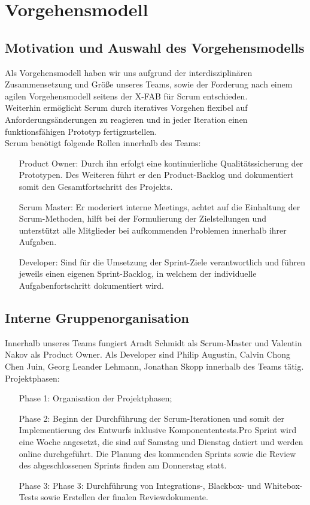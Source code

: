 \chapter{Vorgehensmodell}
\section{Motivation und Auswahl des Vorgehensmodells}

Als Vorgehensmodell haben wir uns aufgrund der interdisziplinären Zusammensetzung und Größe unseres Teams, sowie der Forderung nach einem agilen Vorgehensmodell seitens der X-FAB für Scrum entschieden.\\
Weiterhin ermöglicht Scrum durch iteratives Vorgehen flexibel auf Anforderungsänderungen zu reagieren und in jeder Iteration einen funktionsfähigen Prototyp fertigzustellen.\\

Scrum benötigt folgende Rollen innerhalb des Teams:
\begin{itemize}
	\item[Product Owner:] Durch ihn erfolgt eine kontinuierliche Qualitätssicherung der Prototypen. Des Weiteren führt er den Product-Backlog und dokumentiert somit den Gesamtfortschritt des Projekts.

	\item[Scrum Master:] Er moderiert interne Meetings, achtet auf die Einhaltung der Scrum-Methoden, hilft bei der Formulierung der Zielstellungen und unterstützt alle Mitglieder bei aufkommenden Problemen innerhalb ihrer Aufgaben.

	\item[Developer:]
	Sind für die Umsetzung der Sprint-Ziele verantwortlich und führen jeweils einen eigenen Sprint-Backlog, in welchem der individuelle Aufgabenfortschritt dokumentiert wird.

\end{itemize}

\section{Interne Gruppenorganisation}
Innerhalb unseres Teams fungiert Arndt Schmidt als Scrum-Master und Valentin Nakov als Product Owner. Als Developer sind Philip Augustin, Calvin Chong Chen Juin, Georg Leander Lehmann, Jonathan Skopp innerhalb des Teams tätig.\\
\clearpage
Projektphasen:
\begin{itemize}
	\item[Phase 1:] Organisation der Projektphasen;
	\item[Phase 2:] Beginn der Durchführung der Scrum-Iterationen und somit der Implementierung des Entwurfs inklusive Komponententests.Pro Sprint wird eine Woche angesetzt, die  sind auf Samstag und Dienstag datiert und werden online durchgeführt. Die Planung des kommenden Sprints sowie die Review des abgeschlossenen Sprints finden am Donnerstag statt.
	\item[Phase 3:] Phase 3: Durchführung von Integrations-, Blackbox- und Whitebox-Tests sowie Erstellen der finalen Reviewdokumente.


\end{itemize}
\clearpage

